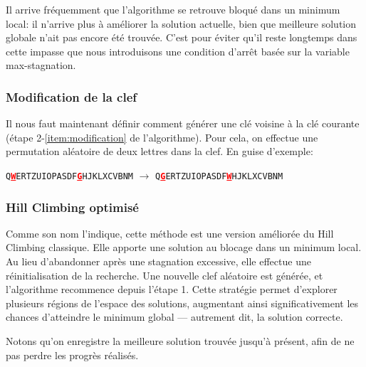 \documentclass[a4paper]{article}
\newcommand{\highlight}[1]{\textbf{\textcolor{red}{\underline{#1}}}}
\begin{document}
Il arrive fréquemment que l’algorithme se retrouve bloqué dans un minimum local: il n’arrive plus à améliorer la solution actuelle, bien que meilleure solution globale n’ait pas encore été trouvée.  
C'est pour éviter qu'il reste longtemps dans cette impasse que nous introduisons une condition d'arrêt basée sur la variable max-stagnation.

\subsubsection*{Modification de la clef}\label{sec:modification_de_la_clef}

Il nous faut maintenant définir comment générer une clé voisine à la clé courante (étape 2-\ref{item:modification} de l’algorithme).  
Pour cela, on effectue une permutation aléatoire de deux lettres dans la clef. En guise d'exemple:

\begin{center}
\texttt{Q\highlight{W}ERTZUIOPASDF\highlight{G}HJKLXCVBNM} $\rightarrow$ \texttt{Q\highlight{G}ERTZUIOPASDF\highlight{W}HJKLXCVBNM}
\end{center}


\subsubsection{Hill Climbing optimisé}

Comme son nom l’indique, cette méthode est une version améliorée du Hill Climbing classique. Elle apporte une solution au blocage dans un minimum local.
Au lieu d’abandonner après une stagnation excessive, elle effectue une réinitialisation de la recherche. Une nouvelle clef aléatoire est générée, et l’algorithme recommence depuis l’étape 1.
Cette stratégie permet d’explorer plusieurs régions de l’espace des solutions, augmentant ainsi significativement les chances d’atteindre le minimum global — autrement dit, la solution correcte.

Notons qu'on enregistre la meilleure solution trouvée jusqu'à présent, afin de ne pas perdre les progrès réalisés.
\end{document}

